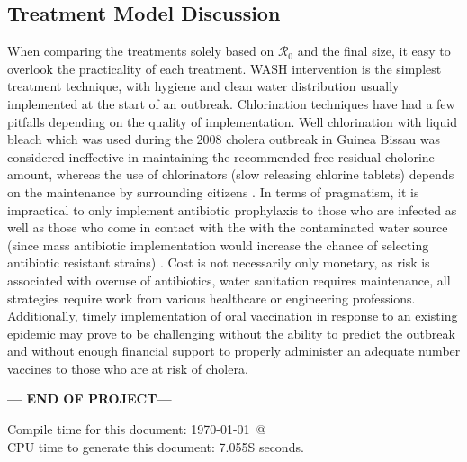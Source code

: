 \documentclass[12pt]{article}\usepackage[]{graphicx}\usepackage[]{color}
\begin{document}

\subsection{Treatment Model Discussion}
When comparing the treatments solely based on $\mathcal R_0$ and the final size, it easy to overlook the practicality of each treatment.
WASH intervention is the simplest treatment technique, with hygiene and clean water distribution usually implemented at the start of an outbreak.
Chlorination techniques have had a few pitfalls depending on the quality of implementation.
Well chlorination with liquid bleach which was used during the 2008 cholera outbreak in Guinea Bissau was considered ineffective in maintaining the recommended free residual cholorine amount, whereas the use of chlorinators (slow releasing chlorine tablets) depends on the maintenance by surrounding citizens \citep{link26}.
In terms of pragmatism, it is impractical to only implement antibiotic prophylaxis to those who are infected as well as those who come in contact with the with the contaminated water source (since mass antibiotic implementation would increase the chance of selecting antibiotic resistant strains) \citep{link23}.
Cost is not necessarily only monetary, as risk is associated with overuse of antibiotics, water sanitation requires maintenance, all strategies require work from various healthcare or engineering professions.
Additionally, timely implementation of oral vaccination in response to an existing epidemic may prove to be challenging without the ability to predict the outbreak and without enough financial support to properly administer an adequate number vaccines to those who are at risk of cholera.

\bigskip\vfill
\centerline{\bf--- END OF PROJECT---}
\bigskip
Compile time for this document:
\today\ @ \thistime\\
CPU time to generate this document: 7.055S seconds.
\printbibliography
\end{document}
